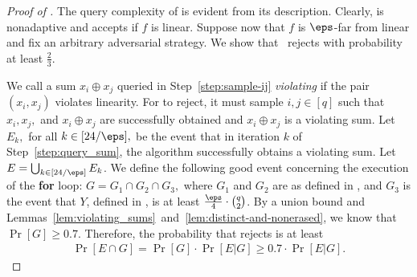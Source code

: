 \documentclass{toc}
\begin{document}
\begin{proof}[Proof of ] The query complexity of  is evident from its description. Clearly,  is nonadaptive and accepts if $f$ is linear. Suppose now that $f$ is $\eps$-far from linear and fix an arbitrary adversarial strategy. We show that~ rejects with probability at least $\frac{2}{3}$. 


We call a sum $x_i \oplus x_j$ queried in Step~\ref{step:sample-ij} {\em violating} if the pair $(x_i, x_j)$ violates linearity. For  to reject, %
it must sample $i,j\in[q]$ such that $x_i, x_j,$ and $x_i \oplus x_j$ are successfully obtained and $x_i \oplus x_j$ is a violating sum. 
%
Let $E_k,$ for all $k\in[24/\eps],$ be the event that in iteration $k$ of Step~\ref{step:query_sum}, the algorithm successfully obtains a violating sum. Let $E=\bigcup_{k\in[24/\eps]} E_k$. 
We define the following good event concerning the execution of the \textbf{for} loop: $G=G_1\cap G_2\cap G_3,$ where $G_1$ and $G_2$ are as defined in , and $G_3$ is the event that $Y$, defined in , is at least $\frac{\eps} 4 \cdot\binom{q}{2}$. By a union bound and Lemmas~\ref{lem:violating_sums}~and~\ref{lem:distinct-and-nonerased}, we know that $\Pr[G]\geq 0.7.$
Therefore, the probability that  rejects 
   is at least 
   \begin{align*}
         \Pr[E \cap G]=\Pr[G]\cdot\Pr[E|G]\geq 0.7\cdot\Pr[E|G].
   \end{align*}
 
   
   

\end{proof}
\end{document}

